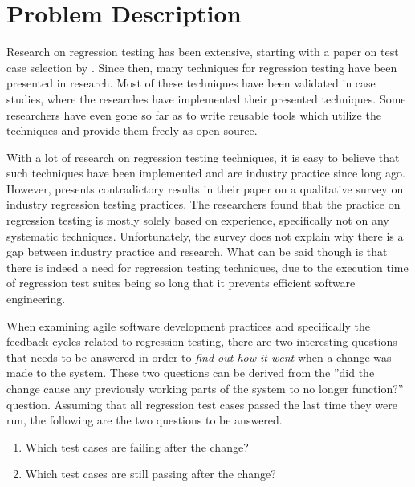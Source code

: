 \documentclass[a4paper,english,12pt]{report}
\begin{document}
\section{Problem Description}
Research on regression testing has been extensive, starting with a paper on test case selection by \citet{fischer1997prioritizing}. Since then, many techniques for regression testing have been presented in research. Most of these techniques have been validated in case studies, where the researches have implemented their presented techniques. Some researchers have even gone so far as to write reusable tools which utilize the techniques and provide them freely as open source. \citep{anwar2014exploration}

With a lot of research on regression testing techniques, it is easy to believe that such techniques have been implemented and are industry practice since long ago. However, \citet{engstrom2010qualitative} presents contradictory results in their paper on a qualitative survey on industry regression testing practices. The researchers found that the practice on regression testing is mostly solely based on experience, specifically not on any systematic techniques. Unfortunately, the survey does not explain why there is a gap between industry practice and research. \citep{engstrom2010qualitative} What can be said though is that there is indeed a need for regression testing techniques, due to the execution time of regression test suites being so long that it prevents efficient software engineering. \citep{runeson2012regression}

When examining agile software development practices and specifically the feedback cycles related to regression testing, there are two interesting questions that needs to be answered in order to \textit{find out how it went} when a change was made to the system. These two questions can be derived from the ''did the change cause any previously working parts of the system to no longer function?'' question. Assuming that all regression test cases passed the last time they were run, the following are the two questions to be answered.

\begin{enumerate}[label=Q.\arabic*]
  \item\label{itm:failing-cases} Which test cases are failing after the change?
  \item\label{itm:passing-cases} Which test cases are still passing after the change?
\end{enumerate}
\end{document}
